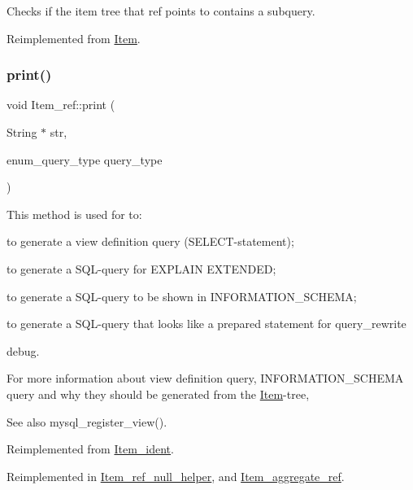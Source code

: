 Checks if the item tree that ref points to contains a subquery. 

Reimplemented from \mbox{\hyperlink{classItem_a555481d359fe1f802b42497d4c39444f}{Item}}.

\mbox{\label{classItem__ref_a90c0289e8983ca73c75eaa92bc762cf6}} 
\subsubsection{\texorpdfstring{print()}{print()}}
{\footnotesize\ttfamily void Item\+\_\+ref\+::print (\begin{DoxyParamCaption}\item[{String $\ast$}]{str,  }\item[{enum\+\_\+query\+\_\+type}]{query\+\_\+type }\end{DoxyParamCaption})\hspace{0.3cm}{\ttfamily [virtual]}}

This method is used for to\+:
\begin{DoxyItemize}
\item to generate a view definition query (S\+E\+L\+E\+CT-\/statement);
\item to generate a S\+QL-\/query for E\+X\+P\+L\+A\+IN E\+X\+T\+E\+N\+D\+ED;
\item to generate a S\+QL-\/query to be shown in I\+N\+F\+O\+R\+M\+A\+T\+I\+O\+N\+\_\+\+S\+C\+H\+E\+MA;
\item to generate a S\+QL-\/query that looks like a prepared statement for query\+\_\+rewrite
\item debug.
\end{DoxyItemize}

For more information about view definition query, I\+N\+F\+O\+R\+M\+A\+T\+I\+O\+N\+\_\+\+S\+C\+H\+E\+MA query and why they should be generated from the \mbox{\hyperlink{classItem}{Item}}-\/tree, \begin{DoxySeeAlso}{See also}
mysql\+\_\+register\+\_\+view(). 
\end{DoxySeeAlso}


Reimplemented from \mbox{\hyperlink{classItem__ident_abbedbcfff5de0cc721c9be3657fcb3ad}{Item\+\_\+ident}}.



Reimplemented in \mbox{\hyperlink{classItem__ref__null__helper_a89293e68530fb3b07572c5005c3220c8}{Item\+\_\+ref\+\_\+null\+\_\+helper}}, and \mbox{\hyperlink{classItem__aggregate__ref_ae6a411b0088c79b64443138fcc3625ba}{Item\+\_\+aggregate\+\_\+ref}}.

